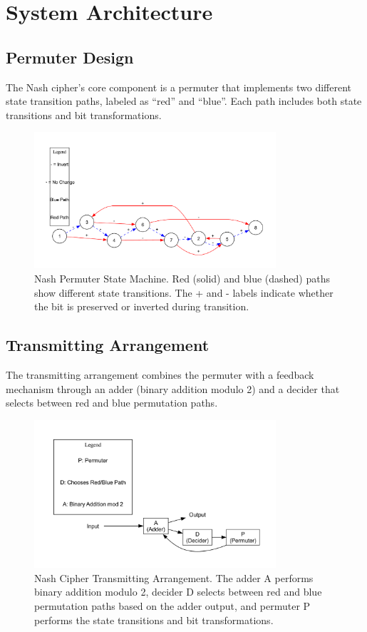 
\section{System Architecture}

\subsection{Permuter Design}
The Nash cipher's core component is a permuter that implements two different state transition paths, labeled as ``red'' and ``blue''. Each path includes both state transitions and bit transformations.

\begin{figure}[H]
    \centering
    \includegraphics[width=0.8\textwidth]{figures/permuter.pdf}
    \caption{Nash Permuter State Machine. Red (solid) and blue (dashed) paths show different state transitions. The + and - labels indicate whether the bit is preserved or inverted during transition.}
    \label{fig:permuter}
\end{figure}

\subsection{Transmitting Arrangement}
The transmitting arrangement combines the permuter with a feedback mechanism through an adder (binary addition modulo 2) and a decider that selects between red and blue permutation paths.

\begin{figure}[H]
    \centering
    \includegraphics[width=0.8\textwidth]{figures/transmitter.pdf}
    \caption{Nash Cipher Transmitting Arrangement. The adder A performs binary addition modulo 2, decider D selects between red and blue permutation paths based on the adder output, and permuter P performs the state transitions and bit transformations.}
    \label{fig:transmitter}
\end{figure}

